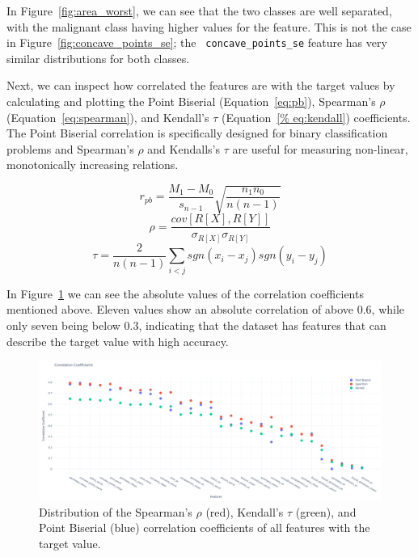 \documentclass[12pt]{article}
\begin{document}
In Figure~\ref{fig:area_worst}, we can see that the two classes are well
separated, with the malignant class having higher values for the feature.
This is not the case in Figure~\ref{fig:concave_points_se}; the \texttt{%
concave\_points\_se} feature has very similar distributions for both classes.

Next, we can inspect how correlated the features are with the target values by
calculating and plotting the Point Biserial (Equation~\ref{eq:pb}), Spearman's
$\rho$ (Equation~\ref{eq:spearman}), and Kendall's $\tau$ (Equation~\ref{%
eq:kendall}) coefficients. The Point Biserial correlation is specifically
designed for binary classification problems and Spearman's $\rho$ and Kendalls's
$\tau$ are useful for measuring non-linear, monotonically increasing relations.

\begin{equation}
    r_{pb} = \frac{M_1 - M_0}{s_{n-1}} \sqrt{\frac{n_1 n_0}{n(n-1)}}
    \label{eq:pb}
\end{equation}
\begin{equation}
    \rho = \frac{cov[R[X], R[Y]]}{\sigma_{R[X]} \sigma_{R[Y]}}
    \label{eq:spearman}
\end{equation}
\begin{equation}
    \tau = \frac{2}{n(n-1)} \sum_{i<j} sgn(x_i - x_j) sgn(y_i - y_j)
    \label{eq:kendall}
\end{equation}


In Figure~\ref{fig:corr_coeffs} we can see the absolute values of the
correlation coefficients mentioned above. Eleven values show an absolute
correlation of above 0.6, while only seven being below 0.3, indicating that
the dataset has features that can describe the target value with high accuracy.

\begin{figure}[H]
    \centering
    \includegraphics[width=\textwidth]{ims/corr_coeffs.png}
    \caption{Distribution of the Spearman's $\rho$ (red), Kendall's $\tau$
    (green), and Point Biserial (blue) correlation coefficients of all features
    with the target value.}
    \label{fig:corr_coeffs}
\end{figure}
\end{document}
